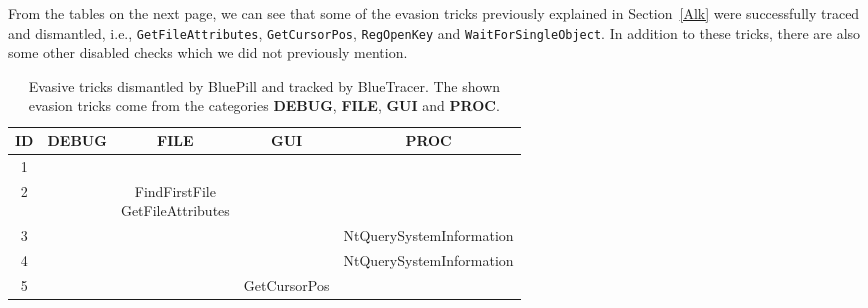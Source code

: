 From the tables on the next page, we can see that some of the evasion tricks previously explained in Section~\ref{Alk} were successfully traced and dismantled, i.e.,
\texttt{GetFileAttributes}, \texttt{GetCursorPos}, \texttt{RegOpenKey} and \texttt{WaitForSingleObject}. In addition to these tricks, there are also some other disabled checks which we did not previously mention. 


\iffalse
2 is memory intensive, coherently with the fact that blabla
\fi


\begin{table}[htp]
\begin{center}
\hspace*{-0.5cm}
\renewcommand{\arraystretch}{1.8}
 \begin{tabular}{|c|c|c|c|c|} 
 \hline
 \textbf{ID} & \textbf{DEBUG} & \textbf{FILE} & \textbf{GUI} & \textbf{PROC} \\ [0.5ex] 
 \hline\hline
 1 & & & & \\ 
 \hline
 2 & & \makecell{FindFirstFile\\GetFileAttributes} & & \\
 \hline
 3 &  &  &  & NtQuerySystemInformation\\
 \hline
 4 &  &  &  & NtQuerySystemInformation\\
 \hline
 5 &  &  & GetCursorPos &\\ [1ex] 
 \hline
\end{tabular}
\end{center}
\caption{Evasive tricks dismantled by BluePill and tracked by BlueTracer. The shown evasion tricks come from the categories \textbf{DEBUG}, \textbf{FILE}, \textbf{GUI} and \textbf{PROC}.}


\end{table}
